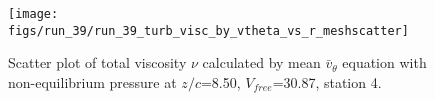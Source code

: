 \begin{figure}[H]
\centering
\texttt{[image: figs/run\_39/run\_39\_turb\_visc\_by\_vtheta\_vs\_r\_meshscatter]}
\caption{Scatter plot of total viscosity $\nu$ calculated by mean $\bar{v}_{\theta}$ equation with non-equilibrium pressure at $z/c$=8.50, $V_{free}$=30.87, station 4.}
\label{fig:run_39_turb_visc_by_vtheta_vs_r_meshscatter}
\end{figure}


